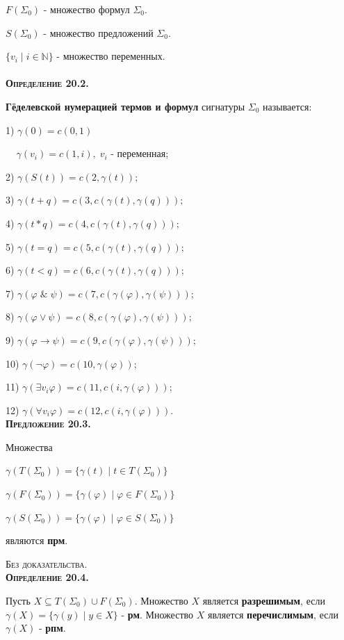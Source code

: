 \documentclass[18pt, a4paper]{extarticle}
\newcommand{\opred}[1]{\textbf{\textsc{Определение #1}}}
\newcommand{\predl}[1]{\textbf{\textsc{Предложение #1}}}
\newcommand{\ampersand}{\;\&\;}
\newcommand{\vp}{\varphi}
\newcommand{\bezdok}{\textsc{Без доказательства.}}
\begin{document}
$F(\Sigma_0)$ - множество  формул $\Sigma_0$.

$S(\Sigma_0)$ - множество  предложений $\Sigma_0$.

$\{v_i\;|\;i\in\mathbb N\}$ - множество переменных.\\\\

\opred{20.2.} 

\textbf{Гёделевской нумерацией термов и формул} сигнатуры $\Sigma_0$
называется: 

1) $\gamma(0)=c(0,1)$

$\;\;\;\;\gamma(v_i)=c(1,i),\;v_i$ - переменная;

2) $\gamma(S(t))=c(2,\gamma(t));$

3) $\gamma(t+q)=c(3,c(\gamma(t),\gamma(q)));$

4) $\gamma(t*q)=c(4,c(\gamma(t),\gamma(q)));$

5) $\gamma(t=q)=c(5,c(\gamma(t),\gamma(q)));$

6) $\gamma(t<q)=c(6,c(\gamma(t),\gamma(q)));$

7) $\gamma(\vp\ampersand\psi)=c(7,c(\gamma(\vp),\gamma(\psi)));$

8) $\gamma(\vp\vee\psi)=c(8,c(\gamma(\vp),\gamma(\psi)));$

9) $\gamma(\vp\to\psi)=c(9,c(\gamma(\vp),\gamma(\psi)));$

10) $\gamma(\lnot\vp)=c(10,\gamma(\vp));$

11) $\gamma(\exists v_i\vp)=c(11,c(i,\gamma(\vp)));$

12) $\gamma(\forall v_i\vp)=c(12,c(i,\gamma(\vp)))$.\\

\predl{20.3.} 

Множества 

$\gamma(T(\Sigma_0))=\{\gamma(t)\;|\;t\in T(\Sigma_0)\}$

$\gamma(F(\Sigma_0))=\{\gamma(\vp)\;|\;\vp\in F(\Sigma_0)\}$

$\gamma(S(\Sigma_0))=\{\gamma(\vp)\;|\;\vp\in S(\Sigma_0)\}$

являются \textbf{прм}.

\bezdok\\

\opred{20.4.} 

Пусть $X\subseteq T(\Sigma_0)\cup F(\Sigma_0)$. Множество $X$ является \textbf{разрешимым}, если $\gamma(X)=\{\gamma(y)\;|\;y\in X\}$ - \textbf{рм}. Множество $X$ является \textbf{перечислимым}, если $\gamma(X)$ - \textbf{рпм}.\\
\end{document}
